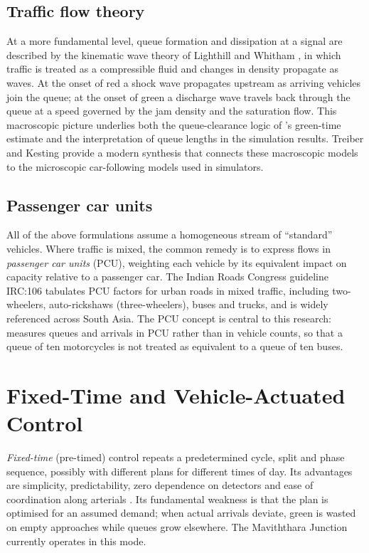 \subsection{Traffic flow theory}
At a more fundamental level, queue formation and dissipation at a signal are described by the kinematic wave
theory of Lighthill and Whitham \cite{lighthill1955}, in which traffic is treated as a compressible fluid and
changes in density propagate as waves. At the onset of red a shock wave propagates upstream as arriving vehicles
join the queue; at the onset of green a discharge wave travels back through the queue at a speed governed by the
jam density and the saturation flow. This macroscopic picture underlies both the queue-clearance logic of
\prism{}'s green-time estimate and the interpretation of queue lengths in the simulation results. Treiber and
Kesting \cite{treiber2013} provide a modern synthesis that connects these macroscopic models to the
microscopic car-following models used in simulators.

\subsection{Passenger car units}
All of the above formulations assume a homogeneous stream of ``standard'' vehicles. Where traffic is mixed, the
common remedy is to express flows in \emph{passenger car units} (PCU), weighting each vehicle by its equivalent
impact on capacity relative to a passenger car. The Indian Roads Congress guideline IRC:106 \cite{irc106}
tabulates PCU factors for urban roads in mixed traffic, including two-wheelers, auto-rickshaws (three-wheelers),
buses and trucks, and is widely referenced across South Asia. The PCU concept is central to this research:
\prism{} measures queues and arrivals in PCU rather than in vehicle counts, so that a queue of ten motorcycles is
not treated as equivalent to a queue of ten buses.

\section{Fixed-Time and Vehicle-Actuated Control}\label{sec:lit-actuated}
\emph{Fixed-time} (pre-timed) control repeats a predetermined cycle, split and phase sequence, possibly with
different plans for different times of day. Its advantages are simplicity, predictability, zero dependence on
detectors and ease of coordination along arterials \cite{koonce2008timing}. Its fundamental weakness is that the
plan is optimised for an assumed demand; when actual arrivals deviate, green is wasted on empty approaches while
queues grow elsewhere. The Maviththara Junction currently operates in this mode.

